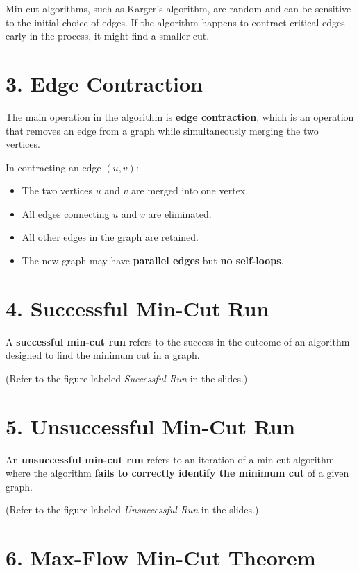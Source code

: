 \documentclass[12pt]{article}
\begin{document}
Min-cut algorithms, such as Karger’s algorithm, are random and can be sensitive to the initial choice of edges. If the algorithm happens to contract critical edges early in the process, it might find a smaller cut.

\section*{3. Edge Contraction}

The main operation in the algorithm is \textbf{edge contraction}, which is an operation that removes an edge from a graph while simultaneously merging the two vertices.

In contracting an edge \( (u, v) \):

\begin{itemize}
    \item The two vertices \( u \) and \( v \) are merged into one vertex.
    \item All edges connecting \( u \) and \( v \) are eliminated.
    \item All other edges in the graph are retained.
    \item The new graph may have \textbf{parallel edges} but \textbf{no self-loops}.
\end{itemize}

\section*{4. Successful Min-Cut Run}

A \textbf{successful min-cut run} refers to the success in the outcome of an algorithm designed to find the minimum cut in a graph.

(Refer to the figure labeled \emph{Successful Run} in the slides.)

\section*{5. Unsuccessful Min-Cut Run}

An \textbf{unsuccessful min-cut run} refers to an iteration of a min-cut algorithm where the algorithm \textbf{fails to correctly identify the minimum cut} of a given graph.

(Refer to the figure labeled \emph{Unsuccessful Run} in the slides.)

\section*{6. Max-Flow Min-Cut Theorem}
\end{document}
